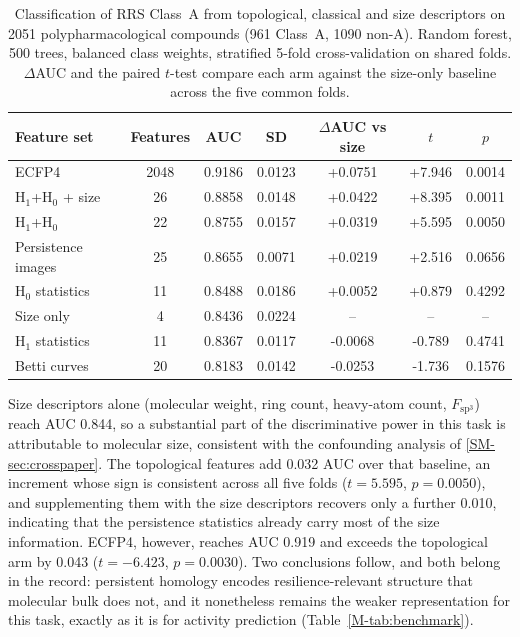 \documentclass[11pt,a4paper]{article}
\begin{document}
\begin{table}[htbp]
\centering
\caption{Classification of RRS Class~A from topological, classical and size descriptors on \num{2051} polypharmacological compounds (\num{961} Class~A, \num{1090} non-A). Random forest, 500 trees, balanced class weights, stratified 5-fold cross-validation on shared folds. $\Delta$AUC and the paired $t$-test compare each arm against the size-only baseline across the five common folds.}
\label{SM-tab:resistance_benchmark}
\begin{tabularx}{\textwidth}{X S[table-format=4.0] S[table-format=1.4] S[table-format=1.4] S[table-format=+1.4] S[table-format=+1.3] S[table-format=1.4]}
\toprule
{Feature set} & {Features} & {AUC} & {SD} & {$\Delta$AUC vs size} & {$t$} & {$p$} \\
\midrule
ECFP4 & 2048 & 0.9186 & 0.0123 & +0.0751 & +7.946 & 0.0014 \\
H$_1$+H$_0$ + size & 26 & 0.8858 & 0.0148 & +0.0422 & +8.395 & 0.0011 \\
H$_1$+H$_0$ & 22 & 0.8755 & 0.0157 & +0.0319 & +5.595 & 0.0050 \\
\midrule
Persistence images & 25 & 0.8655 & 0.0071 & +0.0219 & +2.516 & 0.0656 \\
H$_0$ statistics & 11 & 0.8488 & 0.0186 & +0.0052 & +0.879 & 0.4292 \\
Size only & 4 & 0.8436 & 0.0224 & {--} & {--} & {--} \\
H$_1$ statistics & 11 & 0.8367 & 0.0117 & -0.0068 & -0.789 & 0.4741 \\
Betti curves & 20 & 0.8183 & 0.0142 & -0.0253 & -1.736 & 0.1576 \\
\bottomrule
\end{tabularx}
\end{table}

Size descriptors alone (molecular weight, ring count, heavy-atom count, $F_{\mathrm{sp}^3}$) reach AUC \num{0.844}, so a substantial part of the discriminative power in this task is attributable to molecular size, consistent with the confounding analysis of \cref{SM-sec:crosspaper}. The topological features add \num{0.032} AUC over that baseline, an increment whose sign is consistent across all five folds ($t = \num{5.595}$, $p = \num{0.0050}$), and supplementing them with the size descriptors recovers only a further \num{0.010}, indicating that the persistence statistics already carry most of the size information. ECFP4, however, reaches AUC \num{0.919} and exceeds the topological arm by \num{0.043} ($t = \num{-6.423}$, $p = \num{0.0030}$). Two conclusions follow, and both belong in the record: persistent homology encodes resilience-relevant structure that molecular bulk does not, and it nonetheless remains the weaker representation for this task, exactly as it is for activity prediction (Table~\ref{M-tab:benchmark}).
\end{document}

